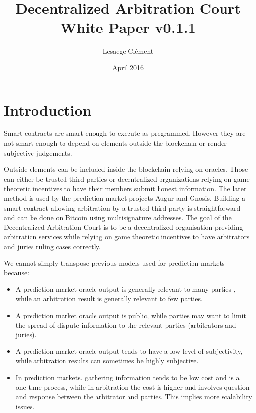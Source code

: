 \documentclass[12 pt]{article}
\title{Decentralized Arbitration Court White Paper v0.1.1}
\author{Lesaege Clément}
\date{April 2016}
\begin{document}
\maketitle

\section{Introduction}

Smart contracts are smart enough to execute as programmed. However they are not smart enough to depend on elements outside the blockchain or render subjective judgements.

Outside elements can be included inside the blockchain relying on oracles. Those can either be trusted third parties\cite{oraclize}
or decentralized organizations relying on game theoretic incentives to have their members submit honest information. The later method is used by the prediction market projects Augur\cite{augur} and Gnosis\cite{gnosis}.
Building a smart contract allowing arbitration by a trusted third party is straightforward and can be done on Bitcoin\cite{bitcoin} using multisignature addresses\cite{bitrared}. 
The goal of the Decentralized Arbitration Court is to be a decentralized organisation providing arbitration services while relying on game theoretic incentives to have arbitrators and juries ruling cases correctly.

We cannot simply transpose previous models used for prediction markets because:
\begin{itemize}
    \item A prediction market oracle output is generally relevant to many parties \cite{decvit}, while an arbitration result is generally relevant to few parties.
	\item A prediction market oracle output is public, while parties may want to limit the spread of dispute information to the relevant parties (arbitrators and juries).
	\item A prediction market oracle output tends to have a low level of subjectivity, while arbitration results can sometimes be highly subjective.
	\item In prediction markets, gathering information tends to be low cost and is a one time process, while in arbitration the cost is higher and involves question and response between the arbitrator and parties. This implies more scalability issues.
\end{itemize}
\end{document}
